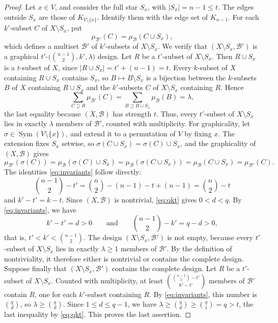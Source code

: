 \documentclass[12pt]{amsart}
\theoremstyle{definition}
\DeclareMathOperator{\Sym}{Sym}
\newcommand{\cB}{\mathcal{B}}
\begin{document}
\begin{proof}
Let $x \in V$, and consider the full star $S_x$, with $|S_x| = n - 1 \leq
t$. The edges outside $S_x$ are those of $K_{V \setminus \{x\}}$. Identify
them with the edge set of $K_{n-1}$. For each $k'$-subset $C$ of $X
\setminus S_x$, put
\[
\mu_{\cB'}(C) = \mu_{\cB}(C \cup S_x),
\]
which defines a multiset $\cB'$ of $k'$-subsets of $X \setminus S_x$. We
verify that $(X \setminus S_x, \cB')$ is a graphical
$t'$-$\bigl(\binom{n-1}{2}, k', \lambda\bigr)$ design. Let $R$ be a
$t'$-subset of $X \setminus S_x$. Then $R \cup S_x$ is a $t$-subset of $X$,
since $|R \cup S_x| = t' + (n - 1) = t$. Every $k$-subset of $X$ containing
$R \cup S_x$ contains $S_x$, so $B \mapsto B \setminus S_x$ is a bijection
between the $k$-subsets $B$ of $X$ containing $R \cup S_x$ and the
$k'$-subsets $C$ of $X \setminus S_x$ containing $R$. Hence
\[
\sum_{C \supseteq R} \mu_{\cB'}(C) = \sum_{B \supseteq R \cup S_x} \mu_{\cB}(B)
= \lambda,
\]
the last equality because $(X, \cB)$ has strength $t$. Thus, every
$t'$-subset of $X \setminus S_x$ lies in exactly $\lambda$ members of
$\cB'$, counted with multiplicity. For graphicality, let $\sigma \in \Sym(V
\setminus \{x\})$, and extend it to a permutation of $V$ by fixing $x$. The
extension fixes $S_x$ setwise, so $\sigma(C \cup S_x) = \sigma(C) \cup S_x$,
and the graphicality of $(X, \cB)$ gives
\[
\mu_{\cB'}(\sigma(C)) = \mu_{\cB}(\sigma(C) \cup S_x) = \mu_{\cB}(\sigma(C \cup S_x))
= \mu_{\cB}(C \cup S_x) = \mu_{\cB'}(C).
\]
The identities \eqref{eq:invariants} follow directly:
\[
\binom{n - 1}{2} - t'
= \binom{n}{2} - (n - 1) - t + (n - 1)
= \binom{n}{2} - t
\]
and $k' - t' = k - t$. Since $(X, \cB)$ is nontrivial, \eqref{eq:qkt} gives
$0 < d < q$. By \eqref{eq:invariants}, we have
\[
k' - t' = d > 0
\qquad \text{and} \qquad
\binom{n - 1}{2} - k' = q - d > 0,
\]
that is, $t' < k' < \binom{n-1}{2}$. The design $(X \setminus S_x, \cB')$ is
not empty, because every $t'$-subset of $X \setminus S_x$ lies in exactly
$\lambda \geq 1$ members of $\cB'$. By the definition of nontriviality, it
therefore either is nontrivial or contains the complete design. Suppose
finally that $(X \setminus S_x, \cB')$ contains the complete design. Let $R$
be a $t'$-subset of $X \setminus S_x$. Counted with multiplicity, at least
$\binom{\binom{n-1}{2} - t'}{k' - t'}$ members of $\cB'$ contain $R$, one
for each $k'$-subset containing $R$. By \eqref{eq:invariants}, this number
is $\binom{q}{d}$, so $\lambda \geq \binom{q}{d}$. Since $1 \leq d \leq q -
1$, we have $\lambda \geq \binom{q}{d} \geq \binom{q}{1} = q > t$, the last
inequality by \eqref{eq:qkt}. This proves the last assertion.
\end{proof}
\end{document}
